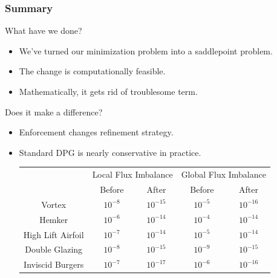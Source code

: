 \documentclass[mathserif]{beamer}
\newcommand{\pecosbold}[1]{{\color{pecos2}{#1}}}
\begin{document}
\begin{frame}
\frametitle{Summary}
What have we done?
\begin{itemize}
\item We've turned our minimization problem into a saddlepoint problem.
\item The change is computationally feasible.
\item Mathematically, it gets rid of troublesome term.
\end{itemize}
Does it make a difference?
\begin{itemize}
\item Enforcement changes refinement strategy.
\item Standard DPG is nearly conservative in practice.
\begin{table}
\centering
\footnotesize
\begin{tabular}{l|c|c|c|c|}
\cline{2-5}
~ & \multicolumn{2}{|c|}{Local Flux Imbalance} & \multicolumn{2}{|c|}{Global Flux Imbalance} \\
\cline{2-5}
~ & Before & After & Before & After \\
\hline
\multicolumn{1}{|c|}{Vortex} & $10^{-8}$ & $10^{-15}$ & $10^{-5}$ & $10^{-16}$ \\
\hline
\multicolumn{1}{|c|}{Hemker} & $10^{-6}$ & $10^{-14}$ & $10^{-4}$ & $10^{-14}$ \\
\hline
\multicolumn{1}{|c|}{High Lift Airfoil} & $10^{-7}$ & $10^{-14}$ & $10^{-5}$ & $10^{-14}$ \\
\hline
\multicolumn{1}{|c|}{Double Glazing} & $10^{-8}$ & $10^{-15}$ & $10^{-9}$ & $10^{-15}$ \\
\hline
\multicolumn{1}{|c|}{Inviscid Burgers} & $10^{-7}$ & $10^{-17}$ & $10^{-6}$ & $10^{-16}$ \\
\hline
\end{tabular}
\end{table}
\end{itemize}
\visible<2->{\pecosbold{We need to study the effect on real fluid dynamics.}}
\end{frame}
\end{document}
